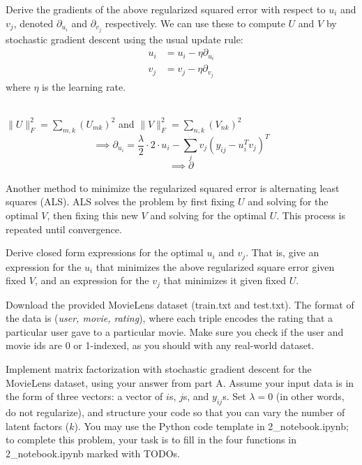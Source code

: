 \problem[5]Derive the gradients of the above regularized squared error with respect to $u_i$ and $v_j$, denoted $\partial_{u_i}$ and $\partial_{v_j}$ respectively.  We can use these to compute $U$ and $V$ by stochastic gradient descent using the usual update rule: 
\begin{align*}
u_i &= u_i - \eta \partial_{u_i} \\
v_j &= v_j - \eta \partial_{v_j}
\end{align*}
where $\eta$ is the learning rate.

\begin{solution}
	\\ $\|U\|_F^2 = \sum_{m,k} (U_{mk})^2$ and $\|V\|_F^2 = \sum_{n,k} (V_{nk})^2$
	$$\implies \partial_{u_i} = \frac{\lambda}{2} \cdot 2 \cdot u_{i} - \sum_{j} v_{j}(y_{ij} - u_{i}^T v_{j})^T$$
	$$\implies \partial_{}$$
\end{solution}

\problem[5]Another method to minimize the regularized squared error is alternating least squares (ALS). ALS solves the problem by first fixing $U$ and solving for the optimal $V$, then fixing this new $V$ and solving for the optimal $U$.  This process is repeated until convergence.

Derive closed form expressions for the optimal $u_i$ and $v_j$.  That is, give an expression for the $u_i$ that minimizes the above regularized square error given fixed $V$, and an expression for the $v_j$ that minimizes it given fixed $U$.

\begin{solution}
\end{solution}

\problem[10]Download the provided MovieLens dataset (train.txt and test.txt).  The format of the data is (\emph{user, movie, rating}), where each triple encodes the rating that a particular user gave to a particular movie. Make sure you check if the user and movie ids are 0 or 1-indexed, as you should with any real-world dataset.

Implement matrix factorization with stochastic gradient descent for the MovieLens dataset, using your answer from part A. Assume your input data is in the form of three vectors: a vector of $i$s, $j$s, and $y_{ij}$s. Set $\lambda = 0$ (in other words, do not regularize), and structure your code so that you can vary the number of latent factors ($k$). You may use the Python code template in 2_notebook.ipynb; to complete this problem, your task is to fill in the four functions in 2_notebook.ipynb marked with TODOs.

